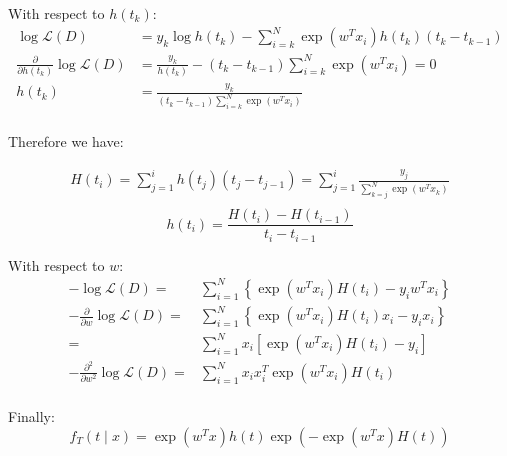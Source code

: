 \documentclass[]{article}
\begin{document}
With respect to $h(t_k)$:
\begin{equation*}
\begin{split}
\log\mathcal{L}(D)&=y_k\log h(t_k)-\sum_{i=k}^{N}\exp(w^Tx_i)h(t_k)(t_k-t_{k-1})\\
\frac{\partial}{\partial h(t_k)}\log\mathcal{L}(D)&=\frac{y_k}{h(t_k)}-(t_k-t_{k-1})\sum_{i=k}^{N}\exp(w^Tx_i)=0\\
h(t_k)&=\frac{y_k}{(t_k-t_{k-1})\sum_{i=k}^{N}\exp(w^Tx_i)}\\
\end{split}
\end{equation*}

Therefore we have:

\begin{equation*}
\begin{split}
H(t_i) = \sum_{j=1}^{i}h(t_j)(t_j-t_{j-1})=\sum_{j=1}^{i}\frac{y_j}{\sum_{k=j}^{N}\exp(w^Tx_k)}\\
\end{split}
\end{equation*}
\[h(t_i) = \frac{H(t_i)-H(t_{i-1})}{t_i-t_{i-1}}\]

With respect to $w$:
\begin{equation*}
\begin{split}
-\log\mathcal{L}(D)
=&\sum_{i=1}^{N}\left\lbrace\exp(w^Tx_i)H(t_i)-y_iw^Tx_i\right\rbrace\\
-\frac{\partial}{\partial w}\log\mathcal{L}(D)=&\sum_{i=1}^{N}\left\lbrace\exp(w^Tx_i)H(t_i)x_i-y_ix_i\right\rbrace\\
=&\sum_{i=1}^{N}x_i\left[\exp(w^Tx_i)H(t_i)-y_i\right]\\
-\frac{\partial^2}{\partial w^2}\log\mathcal{L}(D)=&\sum_{i=1}^{N}x_ix_i^T\exp(w^Tx_i)H(t_i)\\
\end{split}
\end{equation*}

Finally:
\[f_T(t\mid x)=\exp(w^Tx)h(t)\exp(-\exp(w^Tx)H(t))\]
\end{document}
